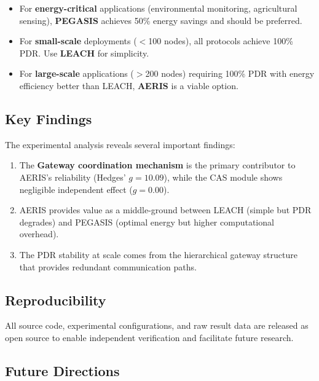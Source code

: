 \begin{itemize}
    \item For \textbf{energy-critical} applications (environmental monitoring,
    agricultural sensing), \textbf{PEGASIS} achieves 50\% energy savings
    and should be preferred.

    \item For \textbf{small-scale} deployments ($<$100 nodes), all protocols
    achieve 100\% PDR. Use \textbf{LEACH} for simplicity.

    \item For \textbf{large-scale} applications ($>$200 nodes) requiring
    100\% PDR with energy efficiency better than LEACH, \textbf{AERIS}
    is a viable option.
\end{itemize}

\subsection{Key Findings}

The experimental analysis reveals several important findings:

\begin{enumerate}
    \item The \textbf{Gateway coordination mechanism} is the primary
    contributor to AERIS's reliability (Hedges' $g = 10.09$), while the
    CAS module shows negligible independent effect ($g = 0.00$).

    \item AERIS provides value as a middle-ground between LEACH (simple
    but PDR degrades) and PEGASIS (optimal energy but higher computational
    overhead).

    \item The PDR stability at scale comes from the hierarchical gateway
    structure that provides redundant communication paths.
\end{enumerate}

\subsection{Reproducibility}

All source code, experimental configurations, and raw result data are
released as open source to enable independent verification and facilitate
future research.

\subsection{Future Directions}

